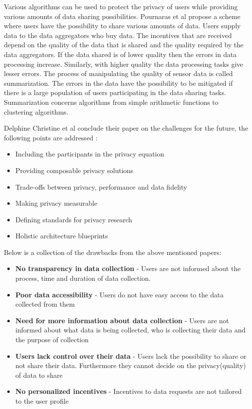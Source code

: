 Various algorithms can be used to protect the privacy of users while providing various amounts of data sharing possibilities. Pournaras et al \cite{pournaras2016self} propose a scheme where users have the possibility to share various amounts of data. Users supply data to the data aggregators who buy data. The incentives that are received depend on the quality of the data that is shared and the quality required by the data aggregators. If the data shared is of lower quality then the errors in data processing increase. Similarly, with higher quality the data processing tasks give lesser errors. The process of manipulating the quality of sensor data is called summarization. The errors in the data have the possibility to be mitigated if there is a large population of users participating in the data sharing tasks. Summarization concerns algorithms from simple arithmetic functions to clustering algorithms.

Delphine Christine et al \cite{christin2016privacy} conclude their paper on the challenges for the future, the following points are addressed \cite{pournarasethical}:

\begin{itemize}
\item Including the participants in the privacy equation
\item Providing composable privacy solutions
\item Trade-offs between privacy, performance and data fidelity
\item Making privacy measurable
\item Defining standards for privacy research
\item Holistic architecture blueprints
\end{itemize}

Below is a collection of the drawbacks from the above mentioned papers:
\begin{itemize}
\item \textbf{No transparency in data collection} - Users are not informed about the process, time and duration of data collection.
\item \textbf{Poor data accessibility} -  Users do not have easy access to the data collected from them
\item \textbf{Need for more information about data collection} - Users are not informed about what data is being collected, who is collecting their data and the purpose of collection
\item \textbf{Users lack control over their data} - Users lack the possibility to share or not share their data. Furthermore they cannot decide on the privacy(quality) of data to share
\item \textbf{No personalized incentives} - Incentives to data requests are not tailored to the user profile
\end{itemize}

